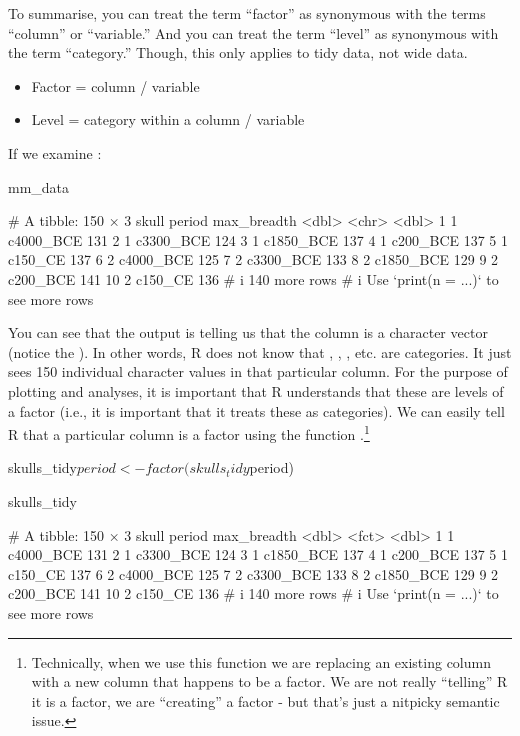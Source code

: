 To summarise, you can treat the term ``factor'' as synonymous with the terms ``column'' or ``variable.'' And you can treat the term ``level'' as synonymous with the term ``category.'' Though, this only applies to tidy data, not wide data.
{
\begin{itemize}
  \setlength\itemsep{-1em}
    \item Factor = column / variable
    \item Level = category within a column / variable
\end{itemize}
}

If we examine :

\begin{inR}
mm_data
\end{inR}
\begin{outR}
# A tibble: 150 × 3
   skull period    max_breadth
   <dbl> <chr>           <dbl>
 1     1 c4000_BCE         131
 2     1 c3300_BCE         124
 3     1 c1850_BCE         137
 4     1 c200_BCE          137
 5     1 c150_CE           137
 6     2 c4000_BCE         125
 7     2 c3300_BCE         133
 8     2 c1850_BCE         129
 9     2 c200_BCE          141
10     2 c150_CE           136
# i 140 more rows
# i Use `print(n = ...)` to see more rows
\end{outR}

\noindent
You can see that the output is telling us that the  column is a character vector (notice the ). In other words, R does not know that , , , etc. are categories. It just sees 150 individual character values in that particular column. For the purpose of plotting and analyses, it is important that R understands that these are levels of a factor (i.e., it is important that it treats these as categories). We can easily tell R that a particular column is a factor using the function .\footnote{Technically, when we use this function we are replacing an existing column with a new column that happens to be a factor. We are not really ``telling'' R it is a factor, we are ``creating'' a factor - but that's just a nitpicky semantic issue.}

\begin{inR}
skulls_tidy$period <- factor(skulls_tidy$period)

skulls_tidy
\end{inR}
\begin{outR}
# A tibble: 150 × 3
   skull period    max_breadth
   <dbl> <fct>           <dbl>
 1     1 c4000_BCE         131
 2     1 c3300_BCE         124
 3     1 c1850_BCE         137
 4     1 c200_BCE          137
 5     1 c150_CE           137
 6     2 c4000_BCE         125
 7     2 c3300_BCE         133
 8     2 c1850_BCE         129
 9     2 c200_BCE          141
10     2 c150_CE           136
# i 140 more rows
# i Use `print(n = ...)` to see more rows
\end{outR}


